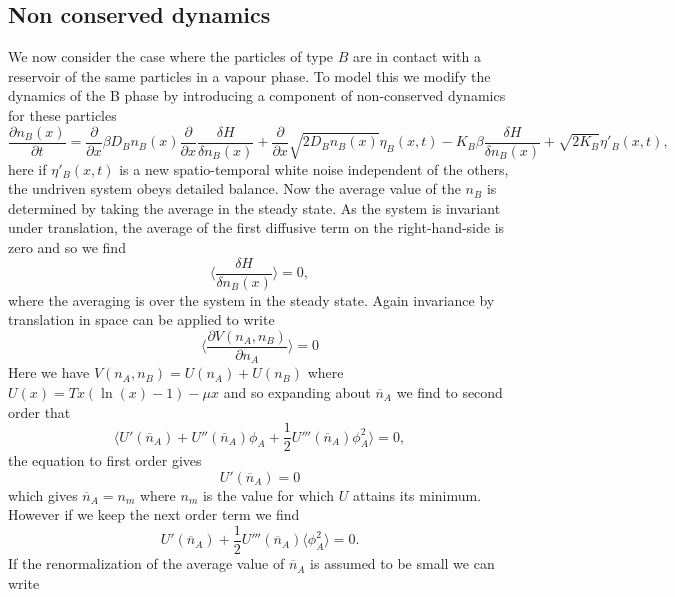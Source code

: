     \subsection{Non conserved dynamics}
We now consider the case where the particles of type $B$ are in contact with 
a reservoir of the same particles in a vapour phase. To model this we modify the dynamics of the B phase by introducing a component of non-conserved dynamics for these particles
\begin{equation}
\frac{\partial n_B(x)}{\partial t} = \frac{\partial}{\partial x} \beta D_B n_B(x)\frac{\partial}{\partial x} \frac{\delta H}{\delta n_B(x)} + \frac{\partial}{\partial x} \sqrt{2D_Bn_B(x)} \eta_B(x,t)
-K_B\beta \frac{\delta H}{\delta n_B(x)} + \sqrt{2K_B}\eta'_B(x,t),
\end{equation}
here if $\eta'_B(x,t)$ is a new spatio-temporal white noise independent of the 
others, the undriven system obeys detailed balance.  Now the average value of the $n_B$ is determined by taking the average in the steady state. As the system is invariant under translation, the average of the first diffusive term on the right-hand-side is zero and so we find
\begin{equation}
\langle \frac{\delta H}{\delta n_B(x)}\rangle=0,
\end{equation}
where the averaging is over the system in the steady state. Again invariance by translation in space can be applied to write
\begin{equation}
\langle \frac{\partial V(n_A,n_B)}{\partial n_A}\rangle  =0
\end{equation}
Here we have $V(n_A,n_B)= U(n_A) + U(n_B)$ where $U(x) = Tx(\ln(x)-1)-\mu x$ and so expanding about $\overline n_A$ we find to second order that 
\begin{equation}
\langle U'(\overline n_A) + U''(\overline n_A)\phi_A +\frac{1}{2}U'''(\overline n_A)\phi_A ^2 \rangle =0,
\end{equation}
the equation to first order gives 
\begin{equation}
U'(\overline n_A)=0
\end{equation}
which gives $\overline n_A= n_m$ where $n_m$ is the value for which $U$ attains its minimum. However if we keep the next order term we find 
\begin{equation}
U'(\overline n_A)+\frac{1}{2} U'''(\overline n_A)\langle\phi_A ^2 \rangle=0.
\end{equation}
If the renormalization of the average value of $\overline n_A$ is assumed to be small we can write
